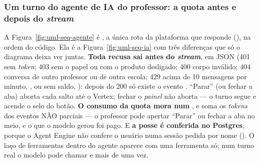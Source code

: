 \subsubsection{Um turno do agente de IA do professor: a quota antes e depois do \emph{stream}}

A Figura~\ref{fig:uml-seq-agente} é ,
a única rota da plataforma que responde  (),
na ordem do código. Ela é a Figura~\ref{fig:uml-seq-ia} com três diferenças que só
o diagrama deixa ver juntas. \textbf{Toda recusa sai antes do \emph{stream}}, em
JSON (401 sem \emph{token}; 403 sem o papel  ou com o produto
desligado; 400 corpo inválido; 404 conversa de outro professor ou de outra
escola; 429 acima de 10 mensagens por minuto, , ou sem saldo,
): depois do 200 só existe o evento . \enquote{Parar} (ou
fechar a aba) aborta cada salto até o Vertex; fechar o \emph{painel} não aborta
--- o turno segue e acende o selo do botão. \textbf{O consumo da quota mora
num }, e soma os \emph{tokens} dos eventos NÃO parciais --- o professor
pode apertar \enquote{Parar} ou fechar a aba no meio, e o que o modelo gerou foi
pago. E \textbf{a posse é
conferida no Postgres}, porque o Agent Engine não confere o usuário numa sessão
pedida por nome (). O laço de ferramentas dentro do agente aparece
com uma ferramenta só; num turno real o modelo pode chamar 
e  mais de uma vez.

